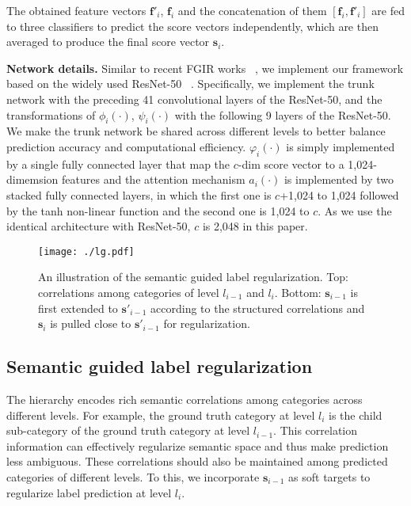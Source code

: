 \documentclass[sigconf]{acmart}
\begin{document}
The obtained feature vectors $\mathbf{f}'_i$, $\mathbf{f}_i$ and the concatenation of them $[\mathbf{f}_i, \mathbf{f}'_i]$ are fed to three classifiers to predict the score vectors independently, which are then averaged to produce the final score vector $\mathbf{s}_i$.

\noindent\textbf{Network details. }Similar to recent FGIR works ~\cite{liu2016fully,liu2017localizing}, we implement our framework based on the widely used ResNet-50 ~\cite{he2016deep}. Specifically, we implement the trunk network with the preceding 41 convolutional layers of the ResNet-50, and the transformations of $\phi_i(\cdot)$, $\psi_i(\cdot)$ with the following 9 layers of the ResNet-50. We make the trunk network be shared across different levels to better balance prediction accuracy and computational efficiency. $\varphi_i(\cdot)$ is simply implemented by a single fully connected layer that map the $c$-dim score vector to a 1,024-dimemsion features and the attention mechanism $a_i(\cdot)$ is implemented by two stacked fully connected layers, in which the first one is $c$+1,024 to 1,024 followed by the tanh non-linear function and the second one is 1,024 to $c$. As we use the identical architecture with ResNet-50, $c$ is 2,048 in this paper.

\begin{figure}[!t]
   \centering{}
   \texttt{[image: ./lg.pdf]} %
   \caption{An illustration of the semantic guided label regularization. Top: correlations among categories of level $l_{i-1}$ and $l_i$. Bottom: $\mathbf{s}_{i-1}$ is first extended to $\mathbf{s}'_{i-1}$ according to the structured correlations and $\mathbf{s}_i$ is pulled close to $\mathbf{s}'_{i-1}$ for regularization.}
   \label{fig:label-regularization}
\end{figure} 


\subsection{Semantic guided label regularization}
The hierarchy encodes rich semantic correlations among categories across different levels. For example, the ground truth category at level $l_i$ is the child sub-category of the ground truth category at level $l_{i-1}$. This correlation information can effectively regularize semantic space and thus make prediction less ambiguous. These correlations should also be maintained among predicted categories of different levels. To this, we incorporate $\mathbf{s}_{i-1}$ as soft targets to regularize label prediction at level $l_i$.
\end{document}
